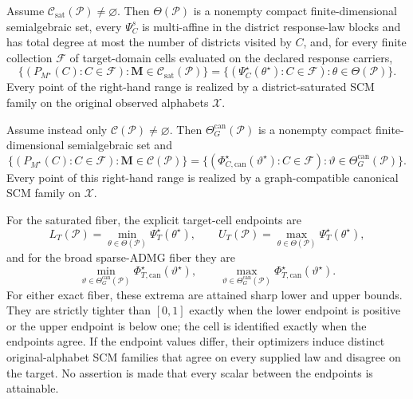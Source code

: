 Assume \(\mathcal C_{\mathrm{sat}}(\mathcal P)\ne\varnothing\). Then \(\Theta(\mathcal P)\) is a nonempty compact finite-dimensional semialgebraic set, every \(\Psi_C^s\) is multi-affine in the district response-law blocks and has total degree at most the number of districts visited by \(C\), and, for every finite collection \(\mathcal F\) of target-domain cells evaluated on the declared response carriers,
\[
\bigl\{(P_{M^\star}(C):C\in\mathcal F):
\mathbf M\in\mathcal C_{\mathrm{sat}}(\mathcal P)\bigr\}
=
\bigl\{(\Psi_C^\star(\theta^\star):C\in\mathcal F):
\theta\in\Theta(\mathcal P)\bigr\}.
\]
Every point of the right-hand range is realized by a district-saturated SCM family on the original observed alphabets \(\mathcal X\).

Assume instead only \(\mathcal C(\mathcal P)\ne\varnothing\). Then \(\Theta_G^{\mathrm{can}}(\mathcal P)\) is a nonempty compact finite-dimensional semialgebraic set and
\[
\bigl\{(P_{M^\star}(C):C\in\mathcal F):
\mathbf M\in\mathcal C(\mathcal P)\bigr\}
=
\bigl\{(\Phi_{C,\mathrm{can}}^\star(\vartheta^\star):C\in\mathcal F):
\vartheta\in\Theta_G^{\mathrm{can}}(\mathcal P)\bigr\}.
\]
Every point of this right-hand range is realized by a graph-compatible canonical SCM family on \(\mathcal X\).

For the saturated fiber, the explicit target-cell endpoints are
\[
L_T(\mathcal P)=\min_{\theta\in\Theta(\mathcal P)}\Psi_T^\star(\theta^\star),
\qquad
U_T(\mathcal P)=\max_{\theta\in\Theta(\mathcal P)}\Psi_T^\star(\theta^\star),
\]
and for the broad sparse-ADMG fiber they are
\[
\min_{\vartheta\in\Theta_G^{\mathrm{can}}(\mathcal P)}
\Phi_{T,\mathrm{can}}^\star(\vartheta^\star),
\qquad
\max_{\vartheta\in\Theta_G^{\mathrm{can}}(\mathcal P)}
\Phi_{T,\mathrm{can}}^\star(\vartheta^\star).
\]
For either exact fiber, these extrema are attained sharp lower and upper bounds. They are strictly tighter than \([0,1]\) exactly when the lower endpoint is positive or the upper endpoint is below one; the cell is identified exactly when the endpoints agree. If the endpoint values differ, their optimizers induce distinct original-alphabet SCM families that agree on every supplied law and disagree on the target. No assertion is made that every scalar between the endpoints is attainable.

